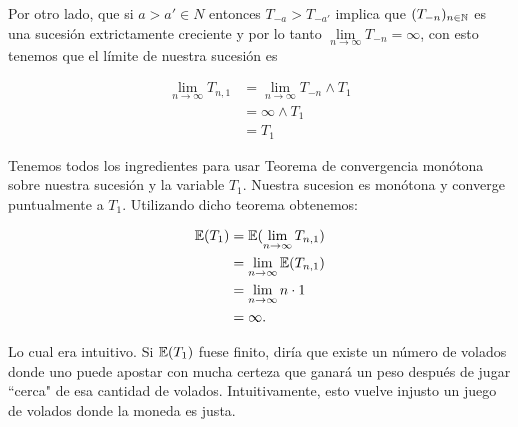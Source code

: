 	Por otro lado, que si $a>a' \in N$ entonces $T_{-a} > T_{-a'}$ implica que $(T_{-n})_{n \in \mathbb{N}}$ es 
	una sucesión extrictamente creciente y por lo tanto 
	$\lim\limits_{n \rightarrow \infty} T_{-n} = \infty$, con esto tenemos que el límite de nuestra 
	sucesión es 
	
    \begin{align}		
        \lim_{n\rightarrow\infty} T_{n,1}   &=  \lim_{n\rightarrow\infty} T_{-n} \wedge T_1 \\
                                            &=  \infty \wedge T_1                           \\
                                            &=  T_1
	\end{align}\pn

	Tenemos todos los ingredientes para usar Teorema de convergencia monótona sobre nuestra sucesión
	y la variable $T_1$. Nuestra sucesion es monótona y converge puntualmente a $T_1$. Utilizando
	dicho teorema obtenemos:
	
	\begin{align}
        \mathbb{E}(T_1)     &=  \mathbb{E}(\lim_{n\rightarrow\infty} T_{n,1})       \\
                    &=  \lim_{n\rightarrow\infty} \mathbb{E}(T_{n,1})       \\
                    &=  \lim_{n\rightarrow\infty} n\cdot 1          \\
                    &=  \infty.
	\end{align}\pn
	
	Lo cual era intuitivo. Si $\mathbb{E}(T_1)$ fuese finito, diría que existe un número de volados donde
	uno puede apostar con mucha certeza que ganará un peso después de jugar ``cerca" de esa cantidad
	de volados. Intuitivamente, esto vuelve injusto un juego de volados donde la moneda es
	justa.	